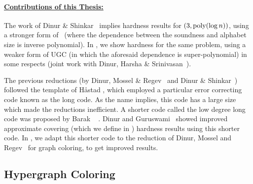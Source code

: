  \paragraph{\underline{Contributions of this Thesis:}}	
The work of Dinur \& Shinkar~\cite{DinurS2010} 
implies hardness results for \AlmostGraphColoring{\epsilon}$(3,\textnormal{poly}(\log n))$,
 using a stronger form of \UGC\ (where the dependence
 between the soundness and alphabet size is inverse polynomial).
In , we show hardness for 
the same problem, using a weaker form of UGC (in which the 
aforesaid dependence 
is super-polynomial) in some respects (joint work with Dinur, Harsha \& Srinivasan~\cite{DinurHSV2014}).

The previous reductions (by Dinur, Mossel \& Regev~\cite{DinurMR2009}
and Dinur \& Shinkar~\cite{DinurS2010}) followed
the template of H\aa stad \cite{Hastad2001}, which employed a particular
error correcting code known as the long code. As the name implies, this
code has a large size which made the reductions inefficient. A shorter
code called the low degree long code was proposed by 
Barak \etal~\cite{BarakGHMRS2012} . Dinur and Guruswami~\cite{DinurG2013} showed
improved approximate covering (which we define in ) hardness results 
 using this shorter code. In , we  adapt this shorter code
  to the reduction of Dinur, Mossel and Regev~\cite{DinurMR2009} for graph coloring,
  to get improved results.
 
 

 
 

\subsection{Hypergraph Coloring}		

